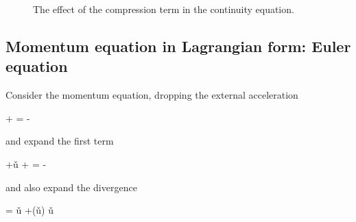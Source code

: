 \begin{figure}
  \begin{center}
  \end{center}
  \caption[]{The effect of the compression term in the continuity equation.}
  \label{fig:compression}
\end{figure}



\subsection{Momentum equation in Lagrangian form: Euler equation}

Consider the momentum equation, dropping the external acceleration 


\beq
{} +  = - 
\eeq

\noindent and expand the first term 

\beq
\rho{} +\v{u}\ptderiv{\rho} +  = - 
\eeq

\noindent and also expand the divergence

\beq
{} = \v{u} +\rho \left(\v{u}\cdot  \grad\right) \v{u}
\eeq


